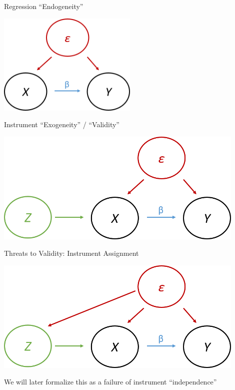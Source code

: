\documentclass[11pt,english]{beamer}
\begin{document}
\begin{frame}{Regression ``Endogeneity''}

\begin{center}
	\includegraphics[width=0.5\textwidth]{figures/dag2.png}
\end{center}

\end{frame}

\begin{frame}{Instrument ``Exogeneity'' / ``Validity''}

\begin{center}
	\includegraphics[width=0.9\textwidth]{figures/dag3.png}
\end{center}

\end{frame}

\begin{frame}{Threats to Validity: Instrument Assignment}
\vspace{0.2cm}

\begin{center}
	\includegraphics[width=0.9\textwidth]{figures/dag4.png}
\end{center}
We will later formalize this as a failure of instrument ``independence''

\end{frame}
\end{document}
